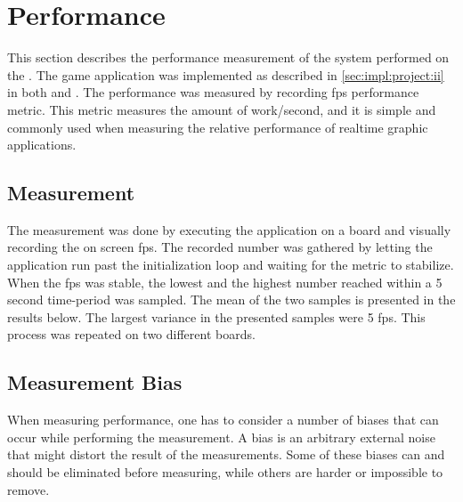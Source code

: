 
\section{Performance}
\label{sec:res:perf}

This section describes the performance measurement of the system performed on the {\DK}.
The game application was implemented as described in \autoref{sec:impl:project:ii} in both {\C} and {\rust}.
The performance was measured by recording \gls{fps} performance metric.
This metric measures the amount of work/second, and it is simple and commonly used when measuring the relative performance of realtime graphic applications.

\subsection{Measurement}
The measurement was done by executing the application on a {\DK} board and visually recording the on screen \gls{fps}.
The recorded number was gathered by letting the application run past the initialization loop and waiting for the metric to stabilize.
When the \gls{fps} was stable, the lowest and the highest number reached within a 5 second time-period was sampled.
The mean of the two samples is presented in the results below.
The largest variance in the presented samples were 5 \gls{fps}.
This process was repeated on two different {\DK} boards.

\subsection{Measurement Bias}
\label{sec:perf:bias}

When measuring performance, one has to consider a number of biases that can occur while performing the measurement.
A bias is an arbitrary external noise that might distort the result of the measurements.
Some of these biases can and should be eliminated before measuring, while others are harder or impossible to remove.

